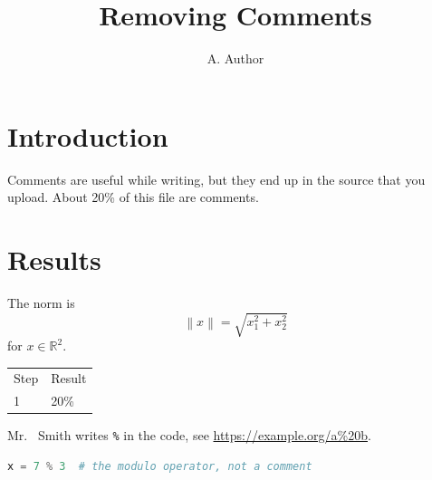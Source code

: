 \documentclass{article}
\title{Removing Comments}  %
\author{A. Author}
\newcommand{\R}{\mathbb{R}}%
\newcommand{\norm}[1]{%
  \left\lVert #1 \right\rVert%
}
\begin{document}
\maketitle

\section{Introduction}
Comments are useful while writing, %
but they end up in the source that you upload.	%
About 20\% of this file are comments.



\section{Results}
The norm is
\[
  \norm{x} = \sqrt{x_1^2 + x_2^2} %
\]
for $x \in \R^2$. %

\begin{tabular}{ll}
  Step & Result \\ %
  1 & 20\% \\
\end{tabular}

Mr.\ %
Smith writes \verb|%| in the code, see \url{https://example.org/a%20b}.

\begin{lstlisting}[language=Python]
x = 7 % 3  # the modulo operator, not a comment
\end{lstlisting}
\end{document}
